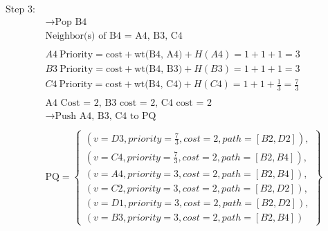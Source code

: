 \documentclass[a4paper]{article}
\begin{document}
\begin{sloppypar}
\begin{enumerate}[start=6,label=Q\arabic*,left=0pt]
    \par Step 3:
    \begin{align*}
        &\rightarrow \text{Pop B4} \\
        &\text{Neighbor(s) of B4 = A4, B3, C4} \\\\
        &A4 \: \text{Priority} = \text{cost} + \text{wt(B4, A4)} + H(A4) = 1 + 1 + 1 = 3 \\
        &B3 \: \text{Priority} = \text{cost} + \text{wt(B4, B3)} + H(B3) = 1 + 1 + 1 = 3 \\
        &C4 \: \text{Priority} = \text{cost} + \text{wt(B4, C4)} + H(C4) = 1 + 1 + \frac{1}{3} = \frac{7}{3} \\\\
        &\text{A4 Cost = 2, B3 cost = 2, C4 cost = 2} \\
        &\rightarrow \text{Push A4, B3, C4 to PQ} \\\\
        &\text{PQ} = \left\{\begin{array}{l}
            (v=D3, priority=\frac{7}{3}, cost=2, path=[B2, D2]), \\
            (v=C4, priority=\frac{7}{3}, cost=2, path=[B2, B4]), \\
            (v=A4, priority=3, cost=2, path=[B2, B4]), \\
            (v=C2, priority=3, cost=2, path=[B2, D2]), \\
            (v=D1, priority=3, cost=2, path=[B2, D2]), \\
            (v=B3, priority=3, cost=2, path=[B2, B4])
        \end{array}\right\}
    \end{align*}


\end{enumerate}
\end{sloppypar}
\end{document}
